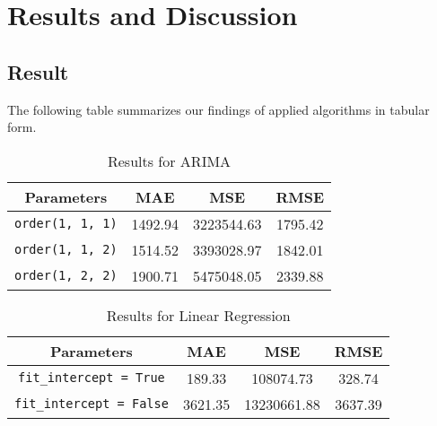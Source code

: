 \section{Results and Discussion}
    \subsection{Result}
        The following table summarizes our findings of applied algorithms in tabular form.
        
        \begin{table}[H]
            \centering
            \setlength\tabcolsep{3 mm}
            \begin{tabular}{c c c c}
                \toprule
                Parameters & MAE & MSE & RMSE\\
                \toprule
                \texttt{order(1, 1, 1)} & 1492.94 & 3223544.63 & 1795.42\\
                \texttt{order(1, 1, 2)} & 1514.52 & 3393028.97 & 1842.01\\
                \texttt{order(1, 2, 2)} & 1900.71 & 5475048.05 & 2339.88\\
                \bottomrule
            \end{tabular}
            \caption{Results for ARIMA}
            \label{tab:my_label}
        \end{table}
        
        \begin{table}[H]
            \centering
            \setlength\tabcolsep{3 mm}
            \begin{tabular}{c c c c}
                \toprule
                Parameters & MAE & MSE & RMSE\\
                \toprule
                \texttt{fit\_intercept = True} & 189.33 & 108074.73 & 328.74\\
                \texttt{fit\_intercept = False} & 3621.35 & 13230661.88 & 3637.39\\
                \bottomrule
            \end{tabular}
            \caption{Results for Linear Regression}
            \label{tab:my_label}
        \end{table}
        
